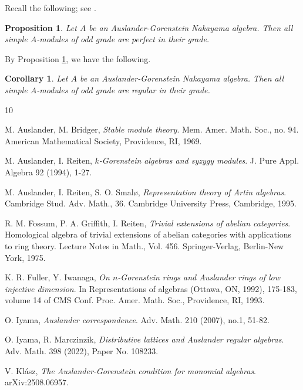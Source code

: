 \documentclass[a4paper,reqno]{amsart}
\numberwithin{equation}{section}
\theoremstyle{plain}
\newtheorem{prop}[thm]{Proposition}
\newtheorem{cor}[thm]{Corollary}
\theoremstyle{definition}
\theoremstyle{remark}
\renewcommand{\-}{\mbox{-}}
\begin{document}
Recall the following; see \cite[Proposition 5.2]{KKM26}.

\begin{prop} \label{prop:kkm}
    Let \(A\) be an Auslander-Gorenstein Nakayama algebra.
    Then all simple \(A\)-modules of odd grade are perfect in their grade. 
\end{prop}

By Proposition \ref{prop:kkm}, we have the following.

\begin{cor}
Let \(A\) be an Auslander-Gorenstein Nakayama algebra.
Then all simple \(A\)-modules of odd grade are regular in their grade. 
\end{cor}



\begin{thebibliography}{10}

M. Auslander, M. Bridger,
{\em Stable module theory}.
Mem. Amer. Math. Soc., no. 94.
American Mathematical Society, Providence, RI, 1969.




M. Auslander, I. Reiten,
{\em \(k\)-Gorenstein algebras and syzygy modules}. 
J. Pure Appl. Algebra 92 (1994), 1-27.    

M. Auslander, I. Reiten, S. O. Smal\o,
{\em Representation theory of Artin algebras}. 
Cambridge Stud. Adv. Math., 36.
Cambridge University Press, Cambridge, 1995.



R. M. Fossum, P. A. Griffith, I. Reiten, 
{\em Trivial extensions of abelian categories}.
Homological algebra of trivial extensions of abelian categories with applications to ring theory.
Lecture Notes in Math., Vol. 456.
Springer-Verlag, Berlin-New York, 1975. 


K. R. Fuller, Y. Iwanaga,
{\em On \(n\)-Gorenstein rings and Auslander rings of low injective dimension}.
In Representations of algebras (Ottawa, ON, 1992), 175-183,
volume 14 of CMS Conf. Proc. Amer. Math. Soc., Providence, RI, 1993.

O. Iyama, 
{\em Auslander correspondence}. 
Adv. Math. 210 (2007), no.1, 51-82.



O. Iyama, R. Marczinzik, 
{\em Distributive lattices and Auslander regular algebras}.
 Adv. Math. 398 (2022), Paper No. 108233.

V. Kl\'asz,
{\em The Auslander-Gorenstein condition for monomial algebras}.
arXiv:2508.06957.



\end{thebibliography}
\end{document}
